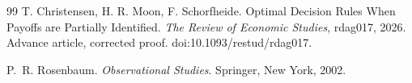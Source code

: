 \begin{thebibliography}{99}
 T. Christensen,
H. R. Moon, F. Schorfheide.
Optimal Decision Rules When Payoffs are Partially Identified.
\emph{The Review of Economic Studies}, rdag017, 2026.
Advance article, corrected proof. doi:10.1093/restud/rdag017.

 P.~R. Rosenbaum.
\emph{Observational Studies}. Springer, New York, 2002.

\end{thebibliography}

